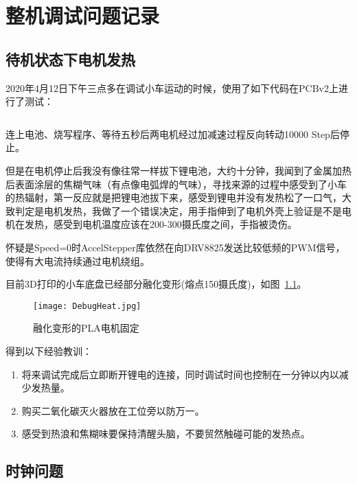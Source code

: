 \chapter{整机调试问题记录}
\label{cha:Debug}

\section{待机状态下电机发热}

2020年4月12日下午三点多在调试小车运动的时候，使用了如下代码在PCBv2上进行了测试：

\inputminted[mathescape, linenos, breaklines]{c}{Code/Stepper-3-Movement/Stepper-3-Movement.ino}

连上电池、烧写程序、等待五秒后两电机经过加减速过程反向转动10000 Step后停止。


但是在电机停止后我没有像往常一样拔下锂电池，大约十分钟，我闻到了金属加热后表面涂层的焦糊气味（有点像电弧焊的气味），寻找来源的过程中感受到了小车的热辐射，第一反应就是把锂电池拔下来，感受到锂电并没有发热松了一口气，大致判定是电机发热，我做了一个错误决定，用手指伸到了电机外壳上验证是不是电机在发热，感受到电机温度应该在200-300摄氏度之间，手指被烫伤。

怀疑是Speed=0时AccelStepper库依然在向DRV8825发送比较低频的PWM信号，使得有大电流持续通过电机绕组。

目前3D打印的小车底盘已经部分融化变形(熔点150摄氏度)，如图~\ref{fig:DebugHeat}。


\begin{figure}[htbp]
    \centering
    \texttt{[image: DebugHeat.jpg]}
    \caption{融化变形的PLA电机固定}
    \label{fig:DebugHeat}
\end{figure}

得到以下经验教训：

\begin{enumerate}
    \item 将来调试完成后立即断开锂电的连接，同时调试时间也控制在一分钟以内以减少发热量。
    \item 购买二氧化碳灭火器放在工位旁以防万一。
    \item 感受到热浪和焦糊味要保持清醒头脑，不要贸然触碰可能的发热点。
\end{enumerate}


\section{时钟问题}

